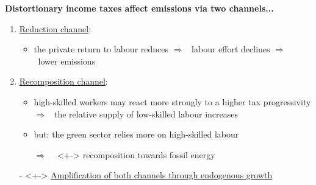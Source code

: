 \documentclass[11pt,aspectratio=169]{beamer}
\newcommand{\ar}{$\Rightarrow$ \ }
\begin{document}
\begin{frame}{}%

\alert{\textbf{Distortionary income taxes affect emissions via two channels...}}
\pause
\vspace{4mm}
\begin{enumerate}
	\item<+-> \underline{Reduction channel}: 
	\vspace{2mm}
	\begin{itemize}
		\item<+-> the private return to labour reduces \ar labour effort declines \ar lower emissions %
	\end{itemize}
\vspace{3mm}
	\item<+-> \underline{Recomposition channel}:
		\vspace{2mm}
	\begin{itemize}
		\item<+->  high-skilled workers may react more strongly to a higher tax progressivity \\ \ar the relative supply of low-skilled labour increases
		\item<+-> but: the green sector relies more on high-skilled labour \citep{Consoli2016DoCapital}
		\item[\ar]<+-> recomposition towards fossil energy
	\end{itemize}
\vspace{3mm}
\item[-]<+-> \underline{Amplification of both channels through endogenous growth}
\end{enumerate}
\end{frame}
\end{document}
